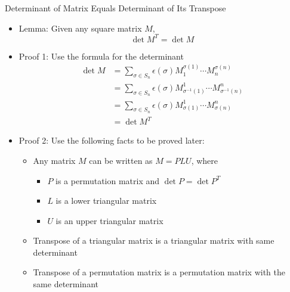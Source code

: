 \documentclass[usenames,dvipsnames,10pt]{beamer}
\begin{document}
\begin{frame}
  {Determinant of Matrix Equals Determinant of Its Transpose}

  \begin{itemize}
  \item Lemma: Given any square matrix $M$,
    \[
      \det M^T = \det M
    \]
  \item Proof 1: Use the formula for the determinant
    \begin{align*}
      \det M &= \sum_{\sigma\in S_n}\epsilon(\sigma)M^{\sigma(1)}_1\cdots M^{\sigma(n)}_n\\
             &= \sum_{\sigma\in S_n}\epsilon(\sigma)M^{1}_{\sigma^{-1}(1)}\cdots M^{n}_{\sigma^{-1}(n)}\\
             &= \sum_{\sigma\in S_n}\epsilon(\sigma)M^{1}_{\sigma(1)}\cdots M^{n}_{\sigma(n)}\\
             &= \det M^T
    \end{align*}
  \item Proof 2: Use the following facts to be proved later:
    \begin{itemize}
    \item Any matrix $M$ can be written as $M = PLU$, where
      \begin{itemize}
      \item $P$ is a permutation matrix and $\det P = \det P^T$
      \item $L$ is a lower triangular matrix
      \item $U$ is an upper triangular matrix
      \end{itemize}
    \item Transpose of a triangular matrix is a triangular matrix with same determinant
    \item Transpose of a permutation matrix is a permutation matrix with the same determinant
    \end{itemize}
  \end{itemize}
\end{frame}
\end{document}
